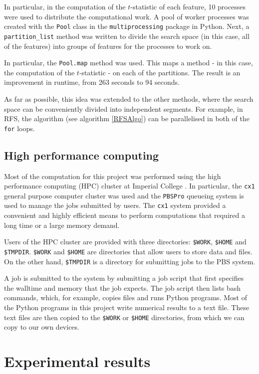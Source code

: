 \documentclass[12pt, twoside, a4paper]{report}
\begin{document}
In particular, in the computation of the $t$-statistic of each feature, 10 processes were used to distribute the computational work. A pool of worker processes was created with the \texttt{Pool} class in the \texttt{multiprocessing} package in Python. Next, a \texttt{partition\_list} method was written to divide the search space (in this case, all of the features) into groups of features for the processes to work on.

In particular, the \texttt{Pool.map} method was used. This maps a method - in this case, the computation of the $t$-statistic - on each of the partitions. The result is an improvement in runtime, from 263 seconds to 94 seconds.

As far as possible, this idea was extended to the other methods, where the search space can be conveniently divided into independent segments. For example, in RFS, the algorithm (see algorithm \ref{RFSAlgo}) can be parallelised in both of the \texttt{for} loops.

\section{High performance computing}

Most of the computation for this project was performed using the high performance computing (HPC) cluster at Imperial College \cite{RefWorks:218}. In particular, the \texttt{cx1} general purpose computer cluster was used and the \texttt{PBSPro} queueing system is used to manage the jobs submitted by users. The \texttt{cx1} system provided a convenient and highly efficient means to perform computations that required a long time or a large memory demand.

Users of the HPC cluster are provided with three directories: \texttt{\$WORK}, \texttt{\$HOME} and \texttt{\$TMPDIR}. \texttt{\$WORK} and \texttt{\$HOME} are directories that allow users to store data and files. On the other hand, \texttt{\$TMPDIR} is a directory for submitting jobs to the PBS system.

A job is submitted to the system by submitting a job script that first specifies the walltime and memory that the job expects. The job script then lists bash commands, which, for example, copies files and runs Python programs. Most of the Python programs in this project write numerical results to a text file. These text files are then copied to the \texttt{\$WORK} or \texttt{\$HOME} directories, from which we can copy to our own devices.


\chapter{Experimental results}
\label{evaluation}
\end{document}
